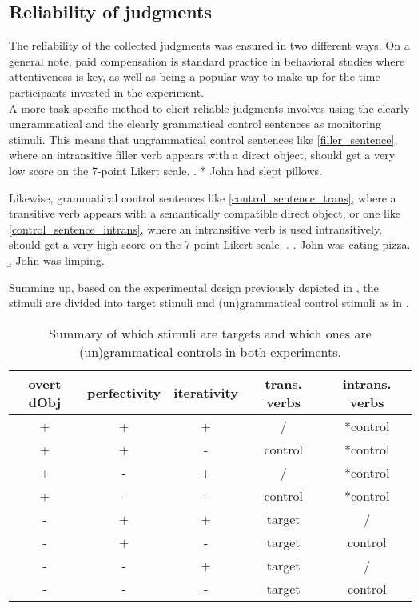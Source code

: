 \subsection{Reliability of judgments} 
The reliability of the collected judgments was ensured in two different ways. On a general note, paid compensation is standard practice in behavioral studies where attentiveness is key, as well as being a popular way to make up for the time participants invested in the experiment.\\
A more task-specific method to elicit reliable judgments involves using the clearly ungrammatical and the clearly grammatical control sentences as monitoring stimuli. This means that ungrammatical control sentences like \ref{filler_sentence}, where an intransitive filler verb appears with a direct object, should get a very low score on the 7-point Likert scale.
\ex. \label{filler_sentence} * John had slept pillows.

Likewise, grammatical control sentences like \ref{control_sentence_trans}, where a transitive verb appears with a semantically compatible direct object, or one like \ref{control_sentence_intrans}, where an intransitive verb is used intransitively, should get a very high score on the 7-point Likert scale.
\ex. \a. \label{control_sentence_trans} John was eating pizza.
\b. \label{control_sentence_intrans} John was limping.

Summing up, based on the experimental design previously depicted in , the stimuli are divided into target stimuli and (un)grammatical control stimuli as in .

\begin{table}[htb] %
\caption{Summary of which stimuli are targets and which ones are (un)grammatical controls in both experiments.}
\begin{tabular}{ccc|cc}
overt dObj & perfectivity & iterativity & trans. verbs & intrans. verbs \\
\hline
+          & +            & + & / & *control           \\
+          & +            & - & control & *control         \\
+          & -            & + & / & *control           \\
+          & -            & - & control & *control        \\
\hline
-          & +            & + & target & /          \\
-          & +            & - & target & control          \\
-          & -            & + & target & /          \\
-          & -            & - & target & control          
\end{tabular}
\end{table}

